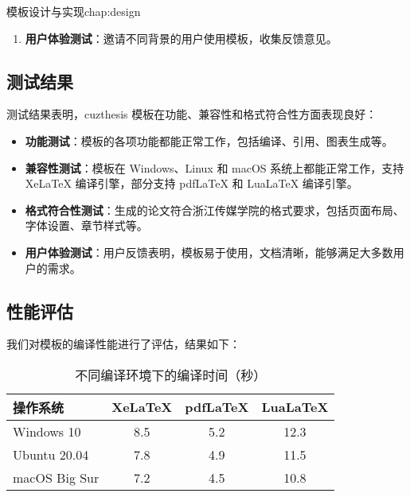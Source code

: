\begin{cuzchapter}{模板设计与实现}{chap:design}
\begin{enumerate}
        \item \textbf{用户体验测试}：邀请不同背景的用户使用模板，收集反馈意见。
    \end{enumerate}
    
    \subsection{测试结果}
    
    测试结果表明，cuzthesis 模板在功能、兼容性和格式符合性方面表现良好：
    
    \begin{itemize}
        \item \textbf{功能测试}：模板的各项功能都能正常工作，包括编译、引用、图表生成等。
        
        \item \textbf{兼容性测试}：模板在 Windows、Linux 和 macOS 系统上都能正常工作，支持 XeLaTeX 编译引擎，部分支持 pdfLaTeX 和 LuaLaTeX 编译引擎。
        
        \item \textbf{格式符合性测试}：生成的论文符合浙江传媒学院的格式要求，包括页面布局、字体设置、章节样式等。
        
        \item \textbf{用户体验测试}：用户反馈表明，模板易于使用，文档清晰，能够满足大多数用户的需求。
    \end{itemize}
    
    \subsection{性能评估}
    
    我们对模板的编译性能进行了评估，结果如下：
    
    \begin{table}[htbp]
        \caption{不同编译环境下的编译时间（秒）}
        \label{tab:compile-time}
        \centering
        \begin{tabular}{lccc}
            \toprule
            操作系统 & XeLaTeX & pdfLaTeX & LuaLaTeX \\
            \midrule
            Windows 10 & 8.5 & 5.2 & 12.3 \\
            Ubuntu 20.04 & 7.8 & 4.9 & 11.5 \\
            macOS Big Sur & 7.2 & 4.5 & 10.8 \\
            \bottomrule
        \end{tabular}
    \end{table}
    

\end{cuzchapter}
